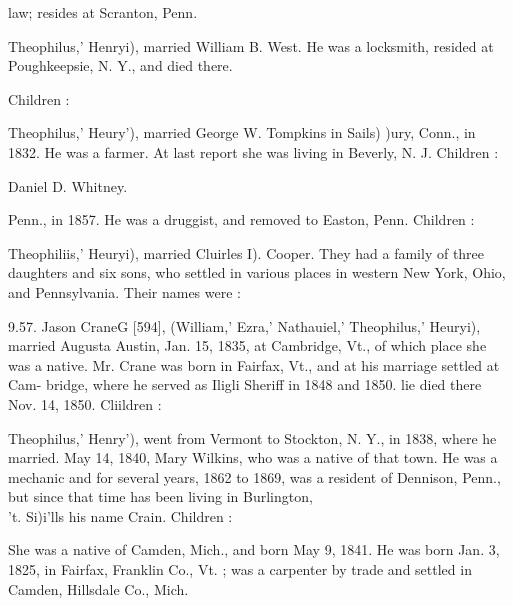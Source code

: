 \documentclass{book}
\begin{document}
law; resides at Scranton, Penn. 


Theophilus,' Henryi), married William B. West. He was a 
locksmith, resided at Poughkeepsie, N. Y., and died there. 

Children : 



Theophilus,' Heury'), married George W. Tompkins in Sails) )ury, 
Conn., in 1832. He was a farmer. At last report she was living 
in Beverly, N. J. Children : 


Daniel D. Whitney. 













Penn., in 1857. He was a druggist, and removed to Easton, 
Penn. Children : 








Theophiliis,' Heuryi), married Cluirles I). Cooper. They had a 
family of three daughters and six sons, who settled in various 
places in western New York, Ohio, and Pennsylvania. Their 
names were : 










9.57. Jason CraneG [594], (William,' Ezra,' Nathauiel,' 
Theophilus,' Heuryi), married Augusta Austin, Jan. 15, 1835, 
at Cambridge, Vt., of which place she was a native. Mr. Crane 
was born in Fairfax, Vt., and at his marriage settled at Cam- 
bridge, where he served as Iligli Sheriff in 1848 and 1850. lie 
died there Nov. 14, 1850. Cliildren : 




Theophilus,' Henry'), went from Vermont to Stockton, N. Y., 
in 1838, where he married. May 14, 1840, Mary Wilkins, who 
was a native of that town. He was a mechanic and for several 
years, 1862 to 1869, was a resident of Dennison, Penn., but 
since that time has been living in Burlington, \\'t. Si)i'lls his 
name Crain. Children : 










She was a native of Camden, Mich., and born May 9, 1841. He 
was born Jan. 3, 1825, in Fairfax, Franklin Co., Vt. ; was a 
carpenter by trade and settled in Camden, Hillsdale Co., Mich. 
\end{document}
